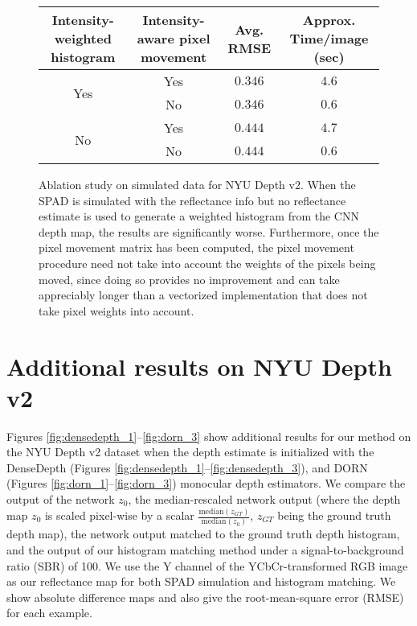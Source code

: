\documentclass[10pt,letterpaper]{article}
\begin{document}
\begin{figure}[H]
  \centering
  \begin{tabular}{c|c|cc}
    \toprule
    Intensity-weighted histogram & Intensity-aware pixel movement & Avg. RMSE & Approx. Time/image (sec) \\
    \midrule
    \multirow{2}{*}{Yes} & Yes & $0.346$ & $4.6$ \\
                         & No & $0.346$ & $0.6$ \\
    \midrule
    \multirow{2}{*}{No} & Yes & $0.444$ & $4.7$ \\
                        & No & $0.444$ & $0.6$ \\
    \bottomrule
  \end{tabular}
  \caption{Ablation study on simulated data for NYU Depth v2. When the SPAD
    is simulated with the reflectance info but no reflectance estimate is used
    to generate a weighted histogram from the CNN depth map, the results are
    significantly worse. Furthermore, once the pixel movement matrix has been
    computed, the pixel movement procedure need not take
  into account the weights of the pixels being moved, since doing so provides no
improvement and can take appreciably longer than a vectorized implementation
that does not take pixel weights into account.}
\end{figure}

\section{Additional results on NYU Depth v2}
Figures \ref{fig:densedepth_1}--\ref{fig:dorn_3} show additional results
for our method on the NYU Depth v2 dataset when the depth estimate is
initialized with the DenseDepth \cite{Alhashim2018} (Figures
\ref{fig:densedepth_1}--\ref{fig:densedepth_3}), and DORN \cite{Fu2018} (Figures
\ref{fig:dorn_1}--\ref{fig:dorn_3}) monocular depth estimators.
We compare the output of the network $z_0$, the
median-rescaled network output (where the depth map $z_0$ is scaled pixel-wise by a
scalar $\frac{\text{median}(z_{GT})}{\text{median}(z_0)}$, $z_{GT}$ being the
ground truth depth map), the network output matched to the ground truth depth histogram, and the output of
our histogram matching method under a signal-to-background ratio (SBR) of 100.
We use the Y channel of the YCbCr-transformed RGB image as our reflectance map
for both SPAD simulation and histogram matching.
We show absolute difference maps and also give
the root-mean-square error (RMSE) for each example.

\end{document}
